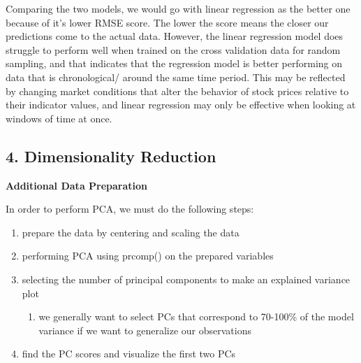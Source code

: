 \documentclass[
]{article}
\providecommand{\tightlist}{%
  \setlength{\itemsep}{0pt}\setlength{\parskip}{0pt}}
\begin{document}
Comparing the two models, we would go with linear regression as the
better one because of it's lower RMSE score. The lower the score means
the closer our predictions come to the actual data. However, the linear
regression model does struggle to perform well when trained on the cross
validation data for random sampling, and that indicates that the
regression model is better performing on data that is chronological/
around the same time period. This may be reflected by changing market
conditions that alter the behavior of stock prices relative to their
indicator values, and linear regression may only be effective when
looking at windows of time at once.

\hypertarget{dimensionality-reduction}{%
\subsection{4. Dimensionality
Reduction}\label{dimensionality-reduction}}

\textbf{Additional Data Preparation}

In order to perform PCA, we must do the following steps:

\begin{enumerate}
\def\labelenumi{\arabic{enumi}.}
\tightlist
\item
  prepare the data by centering and scaling the data
\item
  performing PCA using prcomp() on the prepared variables
\item
  selecting the number of principal components to make an explained
  variance plot

  \begin{enumerate}
  \def\labelenumii{\arabic{enumii}.}
  \tightlist
  \item
    we generally want to select PCs that correspond to 70-100\% of the
    model variance if we want to generalize our observations
  \end{enumerate}
\item
  find the PC scores and visualize the first two PCs
\end{enumerate}
\end{document}
